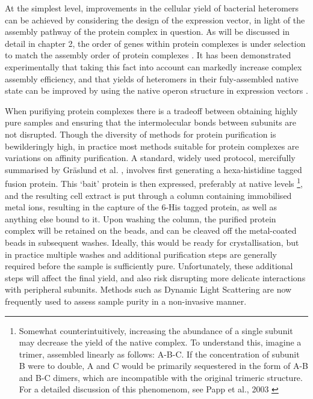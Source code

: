 \documentclass[a4paper,11pt,twoside,openright]{scrbook}
\let\cite\supercite
\begin{document}
At the simplest level, improvements in the cellular yield of bacterial heteromers can be achieved by considering the design of the expression vector, in light of the assembly pathway of the protein complex in question. As will be discussed in detail in chapter 2, the order of genes within protein complexes is under selection to match the assembly order of protein complexes \cite{Wells2016}. It has been demonstrated experimentally that taking this fact into account can markedly increase complex assembly efficiency, and that yields of heteromers in their fuly-assembled native state can be improved by using the native operon structure in expression vectors \cite{Shieh2015a, Poulsen2010}.

When purifiying protein complexes there is a tradeoff between obtaining highly pure samples and ensuring that the intermolecular bonds between subunits are not disrupted. Though the diversity of methods for protein purification is bewilderingly high, in practice most methods suitable for protein complexes are variations on affinity purification. A standard, widely used protocol, mercifully summarised by Gr{\"a}slund et al. \cite{Graslund2008}, involves first generating a hexa-histidine tagged fusion protein. This `bait' protein is then expressed, preferably at native levels \footnote{Somewhat counterintuitively, increasing the abundance of a single subunit may decrease the yield of the native complex. To understand this, imagine a trimer, assembled linearly as follows: A-B-C. If the concentration of subunit B were to double, A and C would be primarily sequestered in the form of A-B and B-C dimers, which are incompatible with the original trimeric structure. For a detailed discussion of this phenomenom, see Papp et al., 2003 \cite{Papp2003}}, and the resulting cell extract is put through a column containing immobilised metal ions, resulting in the capture of the 6-His tagged protein, as well as anything else bound to it. Upon washing the column, the purified protein complex will be retained on the beads, and can be cleaved off the metal-coated beads in subsequent washes. Ideally, this would be ready for crystallisation, but in practice multiple washes and additional purification steps are generally required before the sample is sufficiently pure. Unfortunately, these additional steps will affect the final yield, and also risk disrupting more delicate interactions with peripheral subunits. Methods such as Dynamic Light Scattering are now frequently used to assess sample purity in a non-invasive manner.
\end{document}

